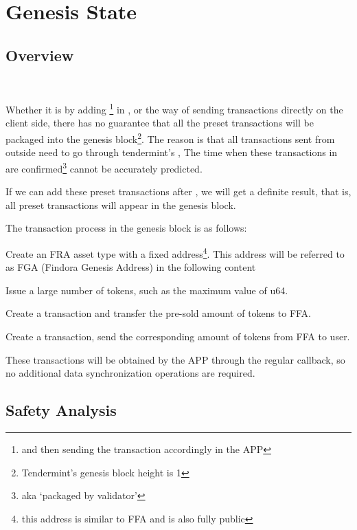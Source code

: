\clearpage

\section{Genesis State}

\subsection{Overview}

~\par

Whether it is by adding \footnote{and then sending the transaction accordingly in the APP}
in ,
or the way of sending transactions directly on the client side, there has no guarantee that all the preset
transactions will be packaged into the genesis block\footnote{Tendermint's genesis block height is 1}.
The reason is that all transactions sent from outside need to go through tendermint's ,
The time when these transactions in  are confirmed\footnote{aka `packaged by validator'} cannot be accurately predicted.

If we can add these preset transactions after , we will get a definite result,
that is, all preset transactions will appear in the genesis block.

The transaction process in the genesis block is as follows:

\begin{ENUMERATE}
    \item Create an FRA asset type with a fixed address\footnote {this address is similar to FFA and is also fully public}.
            This address will be referred to as FGA (Findora Genesis Address) in the following content
    \item Issue a large number of tokens, such as the maximum value of u64.
    \item Create a transaction and transfer the pre-sold amount of tokens to FFA.
    \item Create a transaction, send the corresponding amount of tokens from FFA to user.
    \item These transactions will be obtained by the APP through the regular
             callback, so no additional data synchronization operations are required.
\end{ENUMERATE}

\subsection{Safety Analysis}

